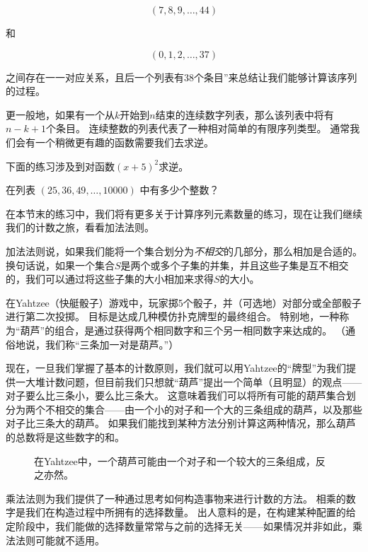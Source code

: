 \[ (7, 8, 9, \ldots , 44 ) \]

\noindent 和

\[ (0, 1, 2, \ldots , 37 ) \]

\noindent 之间存在一一对应关系，且后一个列表有38个条目”来总结让我们能够计算该序列的过程。

更一般地，如果有一个从$k$开始到$n$结束的连续数字列表，那么该列表中将有$n-k+1$个条目。
连续整数的列表代表了一种相对简单的有限序列类型。
通常我们会有一个稍微更有趣的函数需要我们去求逆。

下面的练习涉及到对函数$(x+5)^2$求逆。

\begin{exer}
在列表 $(25, 36, 49, \ldots , 10000)$ 中有多少个整数？
\end{exer}

在本节末的练习中，我们将有更多关于计算序列元素数量的练习，现在让我们继续我们的计数之旅，看看加法法则。

加法法则说，如果我们能将一个集合划分为\emph{不相交}的几部分，那么相加是合适的。
换句话说，如果一个集合$S$是两个或多个子集的并集，并且这些子集是互不相交的，我们可以通过将这些子集的大小相加来求得$S$的大小。

在Yahtzee（快艇骰子）游戏中，玩家掷5个骰子，并（可选地）对部分或全部骰子进行第二次投掷。
目标是达成几种模仿扑克牌型的最终组合。
特别地，一种称为“葫芦”的组合，是通过获得两个相同数字和三个另一相同数字来达成的。
（通俗地说，我们称“三条加一对是葫芦。”）

现在，一旦我们掌握了基本的计数原则，我们就可以用Yahtzee的“牌型”为我们提供一大堆计数问题，但目前我们只想就“葫芦”提出一个简单（且明显）的观点——对子要么比三条小，要么比三条大。
这意味着我们可以将所有可能的葫芦集合划分为两个不相交的集合——由一个小的对子和一个大的三条组成的葫芦，以及那些对子比三条大的葫芦。
如果我们能找到某种方法分别计算这两种情况，那么葫芦的总数将是这些数字的和。

\begin{figure}[!hbtp]
\begin{center}


\vspace{.3in}


\end{center}
\caption[Yahtzee中的葫芦。]{在Yahtzee中，一个葫芦可能由一个对子和一个较大的三条组成，反之亦然。}
\label{fig:full_house} 
\end{figure}

乘法法则为我们提供了一种通过思考如何构造事物来进行计数的方法。
相乘的数字是我们在构造过程中所拥有的选择数量。
出人意料的是，在构建某种配置的给定阶段中，我们能做的选择数量常常与之前的选择无关——如果情况并非如此，乘法法则可能就不适用。

